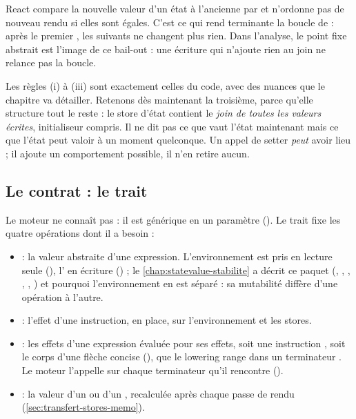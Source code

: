 \begin{react}
  React compare la nouvelle valeur d'un état à l'ancienne par
   et n'ordonne pas de nouveau rendu si elles sont égales.
  C'est ce qui rend terminante la boucle de  : après le premier
  , les suivants ne changent plus rien. Dans l'analyse, le
  point fixe abstrait est l'image de ce bail-out : une écriture qui
  n'ajoute rien au join ne relance pas la boucle.
\end{react}

Les règles (i) à (iii) sont exactement celles du code, avec des nuances que
le chapitre va détailler. Retenons dès maintenant la troisième, parce
qu'elle structure tout le reste : le store d'état contient le \emph{join de
toutes les valeurs écrites}, initialiseur compris. Il ne dit pas \og ce que
vaut l'état maintenant\fg{} mais \og ce que l'état peut valoir à un moment
quelconque\fg{}. Un appel de setter \emph{peut} avoir lieu ; il ajoute un
comportement possible, il n'en retire aucun.

\subsection{Le contrat : le trait }

Le moteur ne connaît pas  : il est générique en un
paramètre  (). Le
trait fixe les quatre opérations dont il a besoin :


\begin{itemize}
  \item {} : la valeur abstraite d'une expression. L'environnement
    est pris en lecture seule (\code{&}), l' en écriture
    () ; le \cref{chap:statevalue-stabilite} a décrit ce paquet
    (, , , , ,
    ) et pourquoi l'environnement en est séparé : sa mutabilité
    diffère d'une opération à l'autre.
  \item {} : l'effet d'une instruction, en place, sur
    l'environnement et les stores.
  \item {} : les effets d'une expression évaluée
    \og pour ses effets\fg{}, soit une instruction , soit le
    corps d'une flèche concise (), que le lowering range
    dans un terminateur . Le moteur l'appelle sur chaque
    terminateur  qu'il rencontre
    ().
  \item {} : la valeur d'un  ou d'un
    , recalculée après chaque passe de rendu
    (\cref{sec:transfert-stores-memo}).
\end{itemize}

